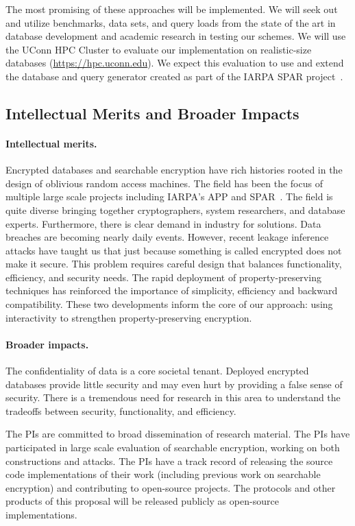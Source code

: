 The most promising of these approaches will be implemented.
We will seek out and utilize benchmarks, data sets, and query loads from
the state of the art in database development and academic research in
testing our schemes.
We will use the UConn HPC Cluster to evaluate our
implementation on realistic-size databases (\url{https://hpc.uconn.edu}).
We expect this evaluation
to use and extend the database and query generator created as part of
the IARPA SPAR project~\cite{varia2015automated}.

\subsection{Intellectual Merits and Broader Impacts}
\paragraph{Intellectual merits.}  
Encrypted databases and searchable encryption have rich histories rooted in the
design of oblivious random access machines.  The field has been the focus of multiple large scale projects including IARPA's APP and SPAR~\cite{spar_baa}.  The field is quite diverse bringing together cryptographers, system researchers, and database experts.  Furthermore, there is clear demand in industry for solutions.  Data breaches are becoming nearly daily events.  However, recent
leakage inference attacks have taught us that just because something is called encrypted does not make it secure.  This problem requires careful design that balances functionality, efficiency, and security needs.  The rapid deployment of property-preserving
techniques has reinforced the importance of simplicity, efficiency and backward
compatibility.  These two developments inform the core of our approach: using
interactivity to strengthen property-preserving encryption.

\paragraph{Broader impacts.}
The confidentiality of data is a core societal tenant.  Deployed encrypted
databases provide little security and may even hurt by providing a false sense
of security.  There is a tremendous need for research in this area to
understand the tradeoffs between security, functionality, and efficiency.

The PIs are committed to broad dissemination of research material.  The PIs
have participated in large scale evaluation of searchable encryption, working
on both constructions and attacks. The PIs have a track record of
releasing the source code implementations of their work (including
previous work on searchable encryption) and contributing
to open-source projects.
The protocols and other products of this proposal will be released
publicly as open-source implementations.

